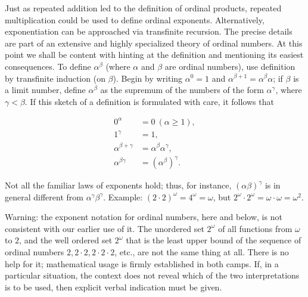 Just as repeated addition led to the definition of ordinal products, repeated multiplication could be used to define ordinal exponents. Alternatively, exponentiation can be approached via transfinite recursion. The precise details are part of an extensive and highly specialized theory of ordinal numbers. At this point we shall be content with hinting at the definition and mentioning its easiest consequences. To define $\alpha^{\beta}$ (where $\alpha$ and $\beta$ are ordinal numbers), use definition by transfinite induction (on $\beta$). Begin by writing $\alpha^{0} = 1$ and $\alpha^{\beta + 1} = \alpha^{\beta} \alpha$; if $\beta$ is a limit number, define $\alpha^{\beta}$ as the supremum of the numbers of the form $\alpha^{\gamma}$, where $\gamma < \beta$. If this sketch of a definition is formulated with care, it follows that

\begin{align*}
0^{\alpha} &= 0\ (\alpha \ge 1),\\
1^{\gamma} &= 1,\\
\alpha^{\beta + \gamma} &= \alpha^{\beta} \alpha^{\gamma} ,\\
\alpha^{\beta \gamma} &= (\alpha^{\beta})^{\gamma}.
\end{align*}

Not all the familiar laws of exponents hold; thus, for instance, $( \alpha \beta)^{\gamma}$ is in general different from $\alpha^{\gamma} \beta^{\gamma}$. Example: $(2 \cdot 2)^{\omega} = 4^{\omega} = \omega$, but $2^{\omega} \cdot 2^{\omega} = \omega \cdot \omega =  \omega^{2}$. 

Warning: the exponent notation for ordinal numbers, here and below, is not consistent with our earlier use of it. The unordered set $2^{\omega}$ of all functions from $\omega$ to $2$, and the well ordered set $2^{\omega}$ that is the least upper bound of the sequence of ordinal numbers $2, 2 \cdot 2, 2 \cdot 2 \cdot 2$, etc., are not the same thing at all. There is no help for it; mathematical usage is firmly established in both camps. If, in a particular situation, the context does not reveal which of the two interpretations is to be used, then explicit verbal indication must be given. 